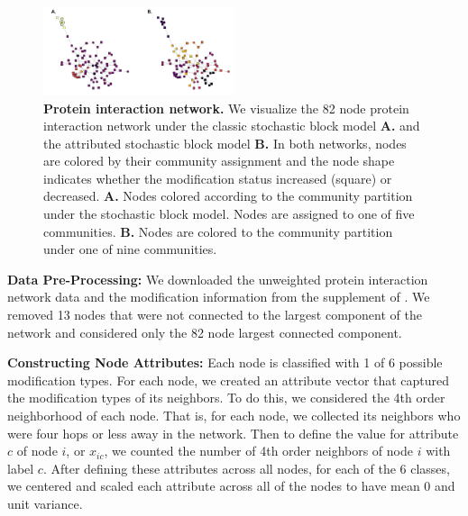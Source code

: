 \documentclass[journal]{IEEEtran}
\begin{document}
\begin{figure}[h!]
\begin{center}
\includegraphics[width=0.5\textwidth]{ProteinNet_Dec12.pdf}
\caption{{\bf Protein interaction network.} We visualize the 82 node protein interaction network under the classic stochastic block model {\bf A.} and the attributed stochastic block model {\bf B.} In both networks, nodes are colored by their community assignment and the node shape indicates whether the modification status increased (square) or decreased. {\bf A.} Nodes colored according to the community partition under the stochastic block model. Nodes are assigned to one of five communities. {\bf B.} Nodes are colored to the community partition under one of nine communities.}
\end{center}
\end{figure}

{\bf Data Pre-Processing: } We downloaded the unweighted protein interaction network data and the modification information from the supplement of \cite{bonacci}. We removed 13 nodes that were not connected to the largest component of the network and considered only the 82 node largest connected component.

{\bf Constructing Node Attributes:}
Each node is classified with 1 of 6 possible modification types. For each node, we created an attribute vector that captured the modification types of its neighbors. To do this, we considered the 4th order neighborhood of each node. That is, for each node, we collected its neighbors who were four hops or less away in the network. Then to define the value for attribute $c$ of node $i$, or $x_{ic}$, we counted the number of 4th order neighbors of node $i$ with label $c$. After defining these attributes across all nodes, for each of the 6 classes, we centered and scaled each attribute across all of the nodes to have mean 0 and unit variance. 
\end{document}
